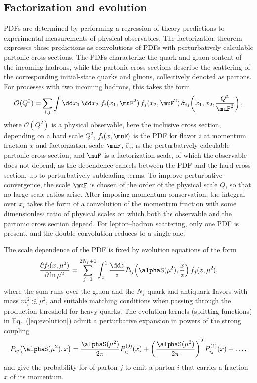 \documentclass[11pt,a4paper]{article}
\begin{document}
\subsection{Factorization and evolution}
\label{sec:factel}

PDFs are determined by performing a regression of theory predictions to experimental measurements of physical observables.
The factorization theorem expresses these predictions as convolutions of PDFs with perturbatively calculable partonic cross sections.
The PDFs characterize the quark and gluon content of the incoming hadrons, while the partonic cross sections describe the scattering of the corresponding initial-state quarks and gluons, collectively denoted as partons.
For processes with two incoming hadrons, this takes the form
%
\begin{equation}
    \mathcal{O}(Q^2) = \sum_{i,j} \int \dd x_{1}\, \dd x_{2}\;
    f_{i}(x_{1}, \muF^2)\,
    f_{j}(x_{2}, \muF^2)\,
    \hat{\sigma}_{ij}\!\left(x_{1}, x_{2},  \frac{Q^2}{\muF^2}\right),
    \label{eq:factorization_theorem}
\end{equation}
%
where $\mathcal{O}(Q^2)$ is a physical observable, here the inclusive cross section, depending on a hard scale $Q^2$, $f_i(x,\muF)$ is the PDF for flavor $i$ at momentum fraction $x$ and factorization scale $\muF$, $\hat{\sigma}_{ij}$ is the perturbatively calculable partonic cross section, and $\muF$ is a factorization scale, of which the observable does not depend, as the dependence cancels between the PDF and the hard cross section, up to perturbatively subleading terms. 
To improve perturbative convergence, the scale $\muF$ is chosen of the order of the physical scale $Q$, so that no large scale ratios arise. After imposing momentum conservation, the integral over $x_i$ takes the form of a convolution of the momentum fraction with some dimensionless ratio of physical scales on which both the observable and the partonic cross section depend. 
For lepton--hadron scattering, only one PDF is present, and the double convolution reduces to a single one. 

The scale dependence of the PDF is fixed by evolution equations of the form
%
\begin{equation}
\label{eq:evolution}
\frac{\partial f_i(x,\mu^2)}{\partial \ln \mu^2}
=
\sum_{j=1}^{2N_f+1} \int_x^1\frac{\dd z}{z}
P_{ij}\!\left(\alphaS(\mu^2),\frac{x}{z}\right)f_j(z,\mu^2),
\end{equation}
%
where the sum runs over the gluon and the $N_f$ quark and antiquark flavors with mass $m^2_i\lesssim \mu^2$, and suitable matching conditions when passing through the production threshold for heavy quarks.
The evolution kernels (splitting functions) in Eq.~(\ref{eq:evolution}) admit a perturbative expansion in powers of the strong coupling
\begin{equation}\label{eq:pertp}
P_{ij}\!\left(\alphaS(\mu^2),x\right)= \frac{\alphaS(\mu^2)}{2\pi} P^{(0)}_{ij}\!\left(x\right)+ 
\left(\frac{\alphaS(\mu^2)}{2\pi}\right)^2 P^{(1)}_{ij}\!\left(x\right)+\dots,
\end{equation} 
and give the
probability for of parton $j$ to emit a parton $i$ that carries a fraction $x$ of its
momentum.
\end{document}
